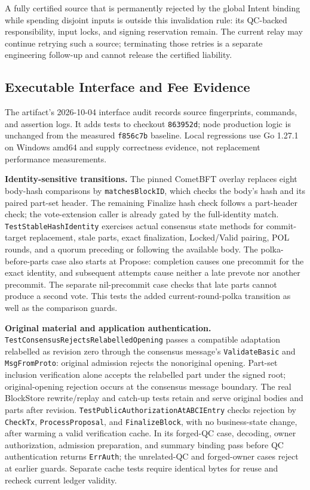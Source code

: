 A fully certified source that is permanently rejected by the global
Intent binding while spending disjoint inputs is outside this
invalidation rule: its QC-backed responsibility, input locks, and
signing reservation remain.  The current relay may continue retrying
such a source; terminating those retries is a separate engineering
follow-up and cannot release the certified liability.

\subsection{Executable Interface and Fee Evidence}
\label{supp:interface-fee-evidence}
The artifact's 2026-10-04 interface audit records source fingerprints,
commands, and assertion logs. It adds tests to checkout \texttt{863952d};
node production logic is unchanged from the measured \texttt{f856c7b}
baseline. Local regressions use Go 1.27.1 on Windows amd64 and supply
correctness evidence, not replacement performance measurements.

\noindent\textbf{Identity-sensitive transitions.}
The pinned CometBFT overlay replaces eight body-hash comparisons by
\texttt{matches\allowbreak BlockID}, which checks the body's hash and its paired part-set
header. The remaining Finalize hash check follows a part-header check;
the vote-extension caller is already gated by the full-identity match.
\texttt{Test\allowbreak Stable\allowbreak Hash\allowbreak Identity} exercises actual consensus state methods for
commit-target replacement, stale parts, exact finalization, Locked/Valid
pairing, POL rounds, and a quorum preceding or following the available body.
The polka-before-parts case also starts at Propose: completion causes one
precommit for the exact identity, and subsequent attempts cause neither a
late prevote nor another precommit. The separate nil-precommit case checks
that late parts cannot produce a second vote. This tests the added
current-round-polka transition as well as the comparison guards.

\noindent\textbf{Original material and application authentication.}
\texttt{Test\allowbreak Consensus\allowbreak Rejects\allowbreak Relabelled\allowbreak Opening} passes a compatible adaptation
relabelled as revision zero through the consensus message's
\texttt{Validate\allowbreak Basic} and \texttt{Msg\allowbreak From\allowbreak Proto}: original admission rejects
the nonoriginal opening. Part-set inclusion verification alone accepts
the relabelled part under the signed root; original-opening rejection
occurs at the consensus message boundary. The real BlockStore rewrite/replay and catch-up
tests retain and serve original bodies and parts after revision.
\texttt{Test\allowbreak Public\allowbreak Authorization\allowbreak At\allowbreak ABCIEntry} checks rejection by
\texttt{CheckTx}, \texttt{ProcessProposal}, and \texttt{FinalizeBlock}, with
no business-state change, after warming a valid verification cache. In its
forged-QC case, decoding, owner authorization, admission preparation, and
summary binding pass before QC authentication returns \texttt{ErrAuth}; the
unrelated-QC and forged-owner cases reject at earlier guards. Separate cache
tests require identical bytes for reuse and recheck current ledger validity.

